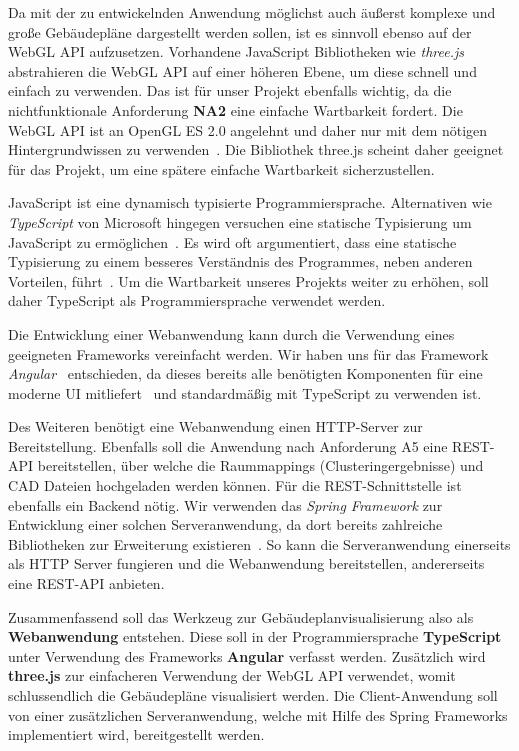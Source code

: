 Da mit der zu entwickelnden Anwendung möglichst auch äußerst komplexe und große Gebäudepläne dargestellt werden sollen, ist es sinnvoll ebenso auf der WebGL API aufzusetzen.
Vorhandene JavaScript Bibliotheken wie \textit{three.js}~\cite{ThreeJS} abstrahieren die WebGL API auf einer höheren Ebene, um diese schnell und einfach zu verwenden.
Das ist für unser Projekt ebenfalls wichtig, da die nichtfunktionale Anforderung \textbf{NA2} eine einfache Wartbarkeit fordert.
Die WebGL API ist an OpenGL ES 2.0 angelehnt und daher nur mit dem nötigen Hintergrundwissen zu verwenden~\cite{WebGL}.
Die Bibliothek three.js scheint daher geeignet für das Projekt, um eine spätere einfache Wartbarkeit sicherzustellen.

JavaScript ist eine dynamisch typisierte Programmiersprache.
Alternativen wie \textit{TypeScript} von Microsoft hingegen versuchen eine statische Typisierung um JavaScript zu ermöglichen~\cite{ToTypeOrNotToType}.
Es wird oft argumentiert, dass eine statische Typisierung zu einem besseres Verständnis des Programmes, neben anderen Vorteilen, führt~\cite{ToTypeOrNotToType}.
Um die Wartbarkeit unseres Projekts weiter zu erhöhen, soll daher TypeScript als Programmiersprache verwendet werden.

Die Entwicklung einer Webanwendung kann durch die Verwendung eines geeigneten Frameworks vereinfacht werden.
Wir haben uns für das Framework \textit{Angular}~\cite{Angular} entschieden, da dieses bereits alle benötigten Komponenten für eine moderne UI mitliefert~\cite{AngularMaterial} und standardmäßig mit TypeScript zu verwenden ist.

Des Weiteren benötigt eine Webanwendung einen HTTP-Server zur Bereitstellung.
Ebenfalls soll die Anwendung nach Anforderung A5 eine REST-API bereitstellen, über welche die Raummappings (Clusteringergebnisse) und CAD Dateien hochgeladen werden können.
Für die REST-Schnittstelle ist ebenfalls ein \glqq{}Backend\grqq{} nötig.
Wir verwenden das \textit{Spring Framework} zur Entwicklung einer solchen Serveranwendung, da dort bereits zahlreiche Bibliotheken zur Erweiterung existieren~\cite{SpringFramework}.
So kann die Serveranwendung einerseits als HTTP Server fungieren und die Webanwendung bereitstellen, andererseits eine REST-API anbieten.

Zusammenfassend soll das Werkzeug zur Gebäudeplanvisualisierung also als \textbf{Webanwendung} entstehen.
Diese soll in der Programmiersprache \textbf{TypeScript} unter Verwendung des Frameworks \textbf{Angular} verfasst werden.
Zusätzlich wird \textbf{three.js} zur einfacheren Verwendung der WebGL API verwendet, womit schlussendlich die Gebäudepläne visualisiert werden.
Die Client-Anwendung soll von einer zusätzlichen Serveranwendung, welche mit Hilfe des Spring Frameworks implementiert wird, bereitgestellt werden.

